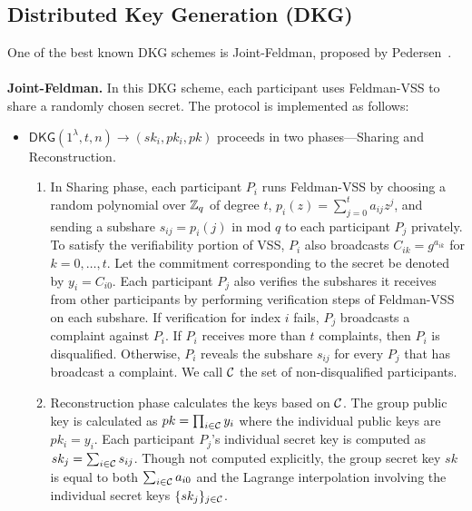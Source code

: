 \subsection{Distributed Key Generation (DKG)}
\label{appendix:dkg}
One of the best known DKG schemes is Joint-Feldman, proposed by Pedersen~\cite{pedersen1991threshold}.\\\\
\noindent\textbf{Joint-Feldman.}
\label{appendix:jointFeldman}
In this DKG scheme, each participant uses Feldman-VSS to share a randomly chosen secret. The protocol is implemented as follows:
\begin{itemize}
    \item $\mathsf{DKG}(1^\lambda, t, n) \rightarrow (sk_i, pk_i, pk)$ proceeds in two phases---Sharing and Reconstruction.
    \begin{enumerate}
        \item In Sharing phase, each participant $P_i$ runs Feldman-VSS by choosing a random polynomial over $\mathbb{Z}_q$ of degree $t$, $p_i(z) = \sum_{j = 0}^{t} a_{ij} z^j$, and sending a subshare $s_{ij} = p_i(j)$ in mod $q$ to each participant $P_j$ privately.
        To satisfy the verifiability portion of VSS, $P_i$ also broadcasts $C_{ik} = g^{a_{ik}}$ for $k = 0, \ldots, t$.
        Let the commitment corresponding to the secret be denoted by $y_i = C_{i0}$.
        Each participant $P_j$ also verifies the subshares it receives from other participants by performing verification steps of Feldman-VSS on each subshare.
        If verification for index $i$ fails, $P_j$ broadcasts a complaint against $P_i$.
        If $P_i$ receives more than $t$ complaints, then $P_i$ is disqualified.
        Otherwise, $P_i$ reveals the subshare $s_{ij}$ for every $P_j$ that has broadcast a complaint.
        We call $\mathcal{C}$ the set of non-disqualified participants.

        \item Reconstruction phase calculates the keys based on $\mathcal{C}$.
        The group public key is calculated as $pk = \prod_{i \in \mathcal{C}} y_i$ where the individual public keys are $pk_i = y_i$.
        Each participant $P_j$'s individual secret key is computed as $sk_j = \sum_{i \in \mathcal{C}} s_{ij}$.
        Though not computed explicitly, the group secret key $sk$ is equal to both $\sum_{i \in \mathcal{C}} a_{i0}$ and the Lagrange interpolation involving the individual secret keys $\{sk_j\}_{j \in \mathcal{C}}$.
    \end{enumerate}
\end{itemize}

